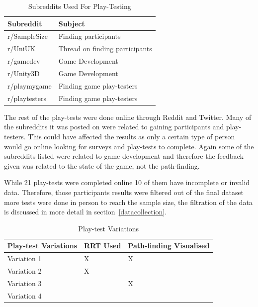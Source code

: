 \documentclass[journal]{IEEEtran}
\begin{document}
	\begin{table}[H]
		\centering
		\caption{Subreddits Used For Play-Testing}
		\label{table:Subreddits}
		\def\arraystretch{1.5}
		\begin{tabular}{ |l|l|}
			\hline
			\textbf{Subreddit}        & \textbf{Subject} \\     \hline
			r/SampleSize              & Finding participants  \\ \hline
			r/UniUK                   & Thread on finding participants \\ \hline
			r/gamedev                 & Game Development \\ \hline
			r/Unity3D                 & Game Development \\ \hline
			r/playmygame              & Finding game play-testers \\ \hline
			r/playtesters             & Finding game play-testers \\ \hline
		\end{tabular}
	\end{table}
	
	The rest of the play-tests were done online through Reddit and Twitter. Many of the subreddits it was posted on were related to gaining participants and play-testers. This could have affected the results as only a certain type of person would go online looking for surveys and play-tests to complete. Again some of the subreddits listed were related to game development and therefore the feedback given was related to the state of the game, not the path-finding.     
	
	While 21 play-tests were completed online 10 of them have incomplete or invalid data. Therefore, those participants results were filtered out of the final dataset more tests were done in person to reach the sample size, the filtration of the data is discussed in more detail in section~\ref{datacollection}.     
	
		\begin{table}[H]
		\centering
		\caption{Play-test Variations}
		\label{table:PlaytestVariations}
		\def\arraystretch{1.5}
		\begin{tabular}{ |l|l|l|}
			\hline
			\textbf{Play-test Variations} & \textbf{RRT Used}& \textbf{Path-finding Visualised} \\ \hline
			Variation 1  &  X & X \\ \hline
			Variation 2  &  X &  \\ \hline
			Variation 3  &    & X \\ \hline
			Variation 4  &    &  \\ \hline
		\end{tabular}
	\end{table}
\end{document}

